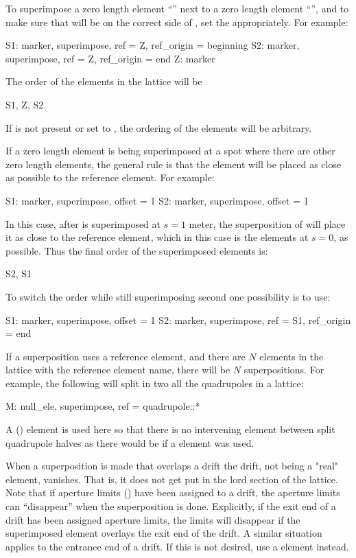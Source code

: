 To superimpose a zero length element ``'' next to a zero length element ``'', and to
make sure that  will be on the correct side of , set the  appropriately.
For example:
\begin{example}
  S1: marker, superimpose, ref = Z, ref_origin = beginning
  S2: marker, superimpose, ref = Z, ref_origin = end
  Z: marker
\end{example}
The order of the elements in the lattice will be
\begin{example}
  S1, Z, S2
\end{example}
If  is not present or set to , the ordering of the elements will be
arbitrary.

If a zero length element is being superimposed at a spot where there are other zero length elements,
the general rule is that the element will be placed as close as possible to the reference element.
For example:
\begin{example}
  S1: marker, superimpose, offset = 1
  S2: marker, superimpose, offset = 1
\end{example}
In this case, after  is superimposed at $s = 1$ meter, the superposition of  will
place it as close to the reference element, which in this case is the  elements at $s
= 0$, as possible. Thus the final order of the superimposed elements is:
\begin{example}
  S2, S1
\end{example}
To switch the order while still superimposing  second one possibility is to use:
\begin{example}
  S1: marker, superimpose, offset = 1
  S2: marker, superimpose, ref = S1, ref_origin = end
\end{example}

If a superposition uses a reference element, and there are $N$ elements in the lattice with the
reference element name, there will be $N$ superpositions. For example, the following will split in
two all the quadrupoles in a lattice:
\begin{example}
  M: null_ele, superimpose, ref = quadrupole::*
\end{example}
A  () element is used here so that there is no intervening element
between split quadrupole halves as there would be if a  element was used.


When a superposition is made that overlaps a drift the drift, not being a "real" element,
vanishes. That is, it does not get put in the lord section of the lattice.  Note that if aperture
limits () have been assigned to a drift, the aperture limits can ``disappear'' when
the superposition is done. Explicitly, if the exit end of a drift has been assigned aperture limits,
the limits will disappear if the superimposed element overlays the exit end of the drift. A similar
situation applies to the entrance end of a drift. If this is not desired, use a  element
instead.

